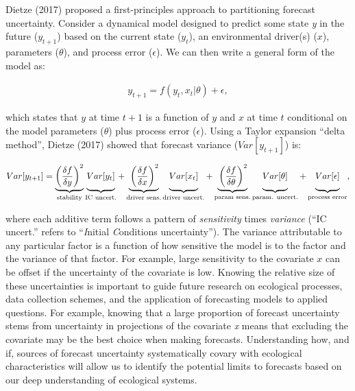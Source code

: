 \documentclass[12pt,]{article}
\begin{document}
Dietze (2017) proposed a first-principles approach to partitioning
forecast uncertainty. Consider a dynamical model designed to predict
some state \emph{y} in the future (\(y_{t+1}\)) based on the current
state (\(y_{t}\)), an environmental driver(s) (\(x\)), parameters
(\(\theta\)), and process error (\(\epsilon\)). We can then write a
general form of the model as: \vspace{-2em}

\begin{align}
y_{t+1} = f(y_t, x_t|\theta) + \epsilon,
\end{align}\vspace{-2em}

which states that \(y\) at time \(t+1\) is a function of \(y\) and \(x\)
at time \(t\) conditional on the model parameters (\(\theta\)) plus
process error (\(\epsilon\)). Using a Taylor expansion ``delta method'',
Dietze (2017) showed that forecast variance (\(Var[y_{t+1}]\)) is:
\vspace{-1em}

\begin{align}
Var[y_{t+1}] = \underbrace{\left(\frac{\delta f}{\delta y} \right)^2}_{\text{stability}} 
               \underbrace{\vphantom{ \left(\frac{\delta f}{\delta y} \right)^2 } Var[y_t]}_{\text{IC uncert.}} +
               \underbrace{\vphantom{ \left(\frac{\delta f}{\delta y} \right)^2 }\left(\frac{\delta f}{\delta x} \right)^2}_{\text{driver sens.}} 
               \underbrace{\vphantom{ \left(\frac{\delta f}{\delta y} \right)^2 } Var[x_t]}_{\text{driver uncert.}} +
               \underbrace{\vphantom{ \left(\frac{\delta f}{\delta y} \right)^2 }\left(\frac{\delta f}{\delta \theta} \right)^2}_{\text{param sens.}}
               \underbrace{\vphantom{ \left(\frac{\delta f}{\delta y} \right)^2 } Var[\theta]}_{\text{param. uncert.}} +
               \underbrace{\vphantom{ \left(\frac{\delta f}{\delta y} \right)^2 } Var[\epsilon]}_{\text{process error}},
\end{align}\vspace{-1em}

where each additive term follows a pattern of \emph{sensitivity} times
\emph{variance} (``IC uncert.'' refers to ``\emph{I}nitial
\emph{C}onditions uncertainty''). The variance attributable to any
particular factor is a function of how sensitive the model is to the
factor and the variance of that factor. For example, large sensitivity
to the covariate \(x\) can be offset if the uncertainty of the covariate
is low. Knowing the relative size of these uncertainties is important to
guide future research on ecological processes, data collection schemes,
and the application of forecasting models to applied questions. For
example, knowing that a large proportion of forecast uncertainty stems
from uncertainty in projections of the covariate \emph{x} means that
excluding the covariate may be the best choice when making forecasts.
Understanding how, and if, sources of forecast uncertainty
systematically covary with ecological characteristics will allow us to
identify the potential limits to forecasts based on our deep
understanding of ecological systems.
\end{document}
